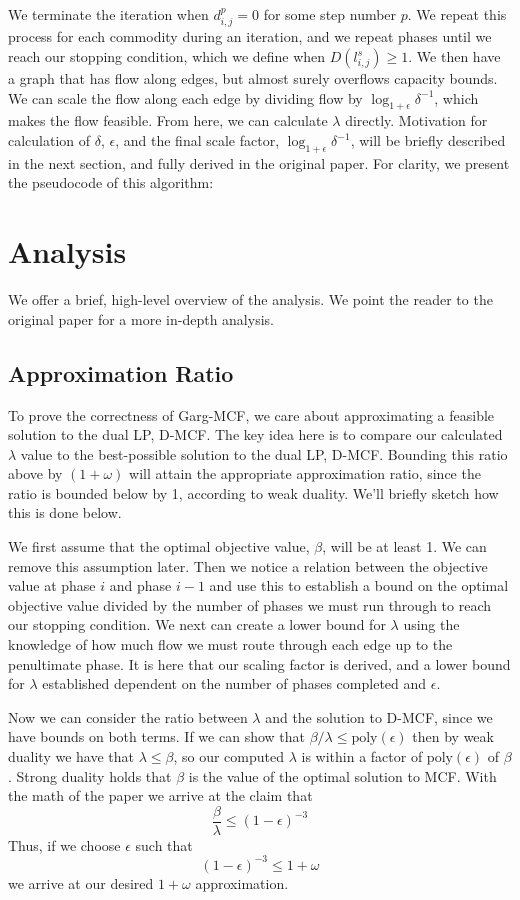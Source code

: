 We terminate
the iteration when $d_{i,j}^p=0$ for some step number $p$. We repeat
this process for each commodity during an iteration, and we repeat
phases until we reach our stopping condition, which we define when 
$D(l_{i,j}^s)\geq 1$. We then have a graph that has flow along edges, but
almost surely overflows capacity bounds. We can scale the flow along each edge by
dividing flow by $\log_{1+\epsilon}\delta^{-1}$, which makes the
flow feasible. From here, we can calculate $\lambda$
directly. Motivation for calculation of $\delta$, $\epsilon$, and the
final scale factor, $\log_{1+\epsilon}\delta^{-1}$, will be
briefly described in the next section, and fully derived in the
original paper. 
For clarity, we present the pseudocode of this
algorithm:


\section{Analysis}
We offer a brief, high-level overview of the analysis. We point the
reader to the original paper for a more in-depth analysis.
\subsection{Approximation Ratio}
To prove the correctness of Garg-MCF, we care about approximating a
feasible solution to the dual LP, D-MCF. The key idea here is to compare
our calculated $\lambda$ value to the best-possible solution to the
dual LP, D-MCF. Bounding this ratio above by $(1+\omega)$ will attain
the appropriate approximation ratio, since the ratio is bounded below
by 1, according to weak duality. We'll briefly sketch how this is
done below.

We first assume that the
optimal objective value, $\beta$, will be at least 1. We can remove this
assumption later. Then we notice a relation between the objective
value at phase $i$ and phase $i-1$ and use this to establish a bound
on the optimal objective value divided by the number of phases we must
run through to reach our stopping condition. We next can create a
lower bound for $\lambda$ using the knowledge of how much flow we must
route through each edge up to the penultimate phase. It is here that
our scaling factor is derived, and a lower bound for $\lambda$
established dependent on the number of phases completed and
$\epsilon$. 

Now we can consider the ratio between $\lambda$ and the solution to
D-MCF, since we have bounds on both terms. If we can show that
$\beta/\lambda\leq \text{poly}(\epsilon)$ then by weak duality we have
that $\lambda \leq \beta$, so our computed $\lambda$ is within a
factor of $\text{poly}(\epsilon)$ of $\beta$. Strong duality holds
that $\beta$ is the value of the optimal solution to MCF. With the
math of the paper  we arrive at the claim that 
$$\frac{\beta}{\lambda}\leq (1-\epsilon)^{-3}$$
Thus, if we choose $\epsilon$ such that 
$$(1-\epsilon)^{-3}\leq 1+\omega$$ 
we arrive at our desired $1+\omega$ approximation.
